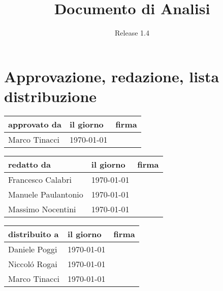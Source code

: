 \documentclass[a4paper, 12pt]{report}
\title{Documento di Analisi}
\author{Release 1.4}
\date{\today \\Firenze \\\begin{figure}[h] \centering
\texttt{[image: ../../images/logokiwi.png]} \end{figure} }
\begin{document}
\maketitle

\section*{Approvazione, redazione, lista distribuzione}
\begin{table}[h!]
  \begin{center}
    \begin{tabular}{| l | l | p{60mm} |}
    \hline
    \textbf{approvato da} & \textbf{il giorno} & \textbf{firma} \\
	\hline    
	Marco Tinacci & \today &  \\
    \hline
    \end{tabular}
  \end{center}
\end{table}

\begin{table}[h!]
  \begin{center}
    \begin{tabular}{| l | l | p{60mm} |}
    \hline
    \textbf{redatto da} & \textbf{il giorno} & \textbf{firma} \\
    \hline
    Francesco Calabri & \today &  \\
    \hline
	Manuele Paulantonio & \today &  \\
    \hline    
	Massimo Nocentini & \today &  \\
    \hline
    \end{tabular}
  \end{center}
\end{table}

\begin{table}[h!]
  \begin{center}
    \begin{tabular}{| l | l | p{60mm} |}
    \hline
    \textbf{distribuito a} & \textbf{il giorno} & \textbf{firma} \\
	\hline    
	Daniele Poggi & \today &  \\
    \hline
	Niccol\'o Rogai & \today &  \\
    \hline
	Marco Tinacci & \today &  \\
    \hline
    \end{tabular}
  \end{center}
\end{table}
\end{document}
